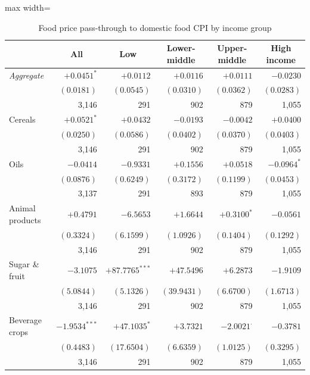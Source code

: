 
\begin{table}[htbp]
\centering
\caption{Food price pass-through to domestic food CPI by income group}
\label{tab:cpi-passthrough}
\begin{adjustbox}{max width=\textwidth}
\begin{threeparttable}\small
\begin{tabular}{l rrrrr}
\toprule
 & \multicolumn{1}{c}{All} & \multicolumn{1}{c}{Low} & \multicolumn{1}{c}{Lower-middle} & \multicolumn{1}{c}{Upper-middle} & \multicolumn{1}{c}{High income} \\
\midrule
\textit{Aggregate} & $+0.0451^{*}$ & $+0.0112$ & $+0.0116$ & $+0.0111$ & $-0.0230$ \\
   & $(0.0181)$ & $(0.0545)$ & $(0.0310)$ & $(0.0362)$ & $(0.0283)$ \\
   & 3,146 & 291 & 902 & 879 & 1,055 \\[3pt]
\quad Cereals & $+0.0521^{*}$ & $+0.0432$ & $-0.0193$ & $-0.0042$ & $+0.0400$ \\
   & $(0.0250)$ & $(0.0586)$ & $(0.0402)$ & $(0.0370)$ & $(0.0403)$ \\
   & 3,146 & 291 & 902 & 879 & 1,055 \\[3pt]
\quad Oils & $-0.0414$ & $-0.9331$ & $+0.1556$ & $+0.0518$ & $-0.0964^{*}$ \\
   & $(0.0876)$ & $(0.6249)$ & $(0.3172)$ & $(0.1199)$ & $(0.0453)$ \\
   & 3,137 & 291 & 893 & 879 & 1,055 \\[3pt]
\quad Animal products & $+0.4791$ & $-6.5653$ & $+1.6644$ & $+0.3100^{*}$ & $-0.0561$ \\
   & $(0.3324)$ & $(6.1599)$ & $(1.0926)$ & $(0.1404)$ & $(0.1292)$ \\
   & 3,146 & 291 & 902 & 879 & 1,055 \\[3pt]
\quad Sugar \& fruit & $-3.1075$ & $+87.7765^{***}$ & $+47.5496$ & $+6.2873$ & $-1.9109$ \\
   & $(5.0844)$ & $(5.1326)$ & $(39.9431)$ & $(6.6700)$ & $(1.6713)$ \\
   & 3,146 & 291 & 902 & 879 & 1,055 \\[3pt]
\quad Beverage crops & $-1.9534^{***}$ & $+47.1035^{*}$ & $+3.7321$ & $-2.0021^{\cdot}$ & $-0.3781$ \\
   & $(0.4483)$ & $(17.6504)$ & $(6.6359)$ & $(1.0125)$ & $(0.3295)$ \\
   & 3,146 & 291 & 902 & 879 & 1,055 \\[3pt]

\end{tabular}
\end{threeparttable}
\end{adjustbox}
\end{table}
